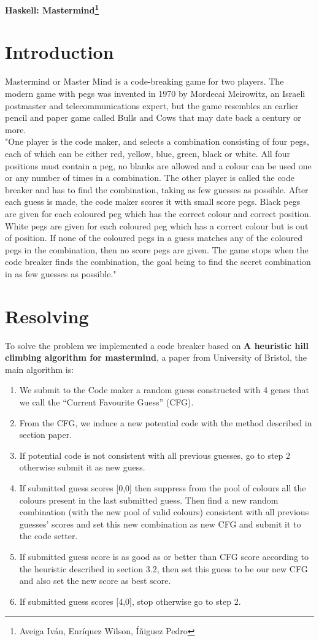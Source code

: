 \textbf{Haskell: Mastermind\footnote{Aveiga Iván, Enríquez Wilson, Íñiguez Pedro}}

\section{Introduction}
Mastermind or Master Mind is a code-breaking game for two players. The modern game with pegs was invented in 1970 by Mordecai Meirowitz, an Israeli postmaster and telecommunications expert, but the game resembles an earlier pencil and paper game called Bulls and Cows that may date back a century or more. \\

"One player is the code maker, and selects a combination consisting of four pegs, each of which can be either red, yellow, blue, green, black or white. All four positions must contain a peg, no blanks are allowed and a colour can be used one or any number of times in a combination. The other player is called the code breaker and has to find
the combination, taking as few guesses as possible. After each guess is made, the code maker scores it
with small score pegs. Black pegs are given for each coloured peg which has the correct colour and correct
position. White pegs are given for each coloured peg which has a correct colour but is out of position. If
none of the coloured pegs in a guess matches any of the coloured pegs in the combination, then no score
pegs are given. The game stops when the code breaker finds the combination, the goal being to find
the secret combination in as few guesses as possible."

\section{Resolving}
To solve the problem we implemented a code breaker based on \textbf{
A heuristic hill climbing algorithm for mastermind}, a paper from University of Bristol, the main algorithm is: 
 \begin{enumerate}
  \item We submit to the Code maker a random guess
 	constructed with 4 genes that we call the “Current
 	Favourite Guess” (CFG).
 	\item From the CFG, we induce a new potential code
 	with the method described in section paper.
 	\item If potential code is not consistent with all previous
 	guesses, go to step 2 otherwise submit it as new
 	guess.
 	\item If submitted guess scores [0,0] then suppress from
 	the pool of colours all the colours present in the last
 	submitted guess. Then find a new random
 	combination (with the new pool of valid colours)
 	consistent with all previous guesses’ scores and set
 	this new combination as new CFG and submit it to
 	the code setter.
 	\item If submitted guess score is as good as or better
 	than CFG score according to the heuristic described
 	in section 3.2, then set this guess to be our new CFG
 	and also set the new score as best score.
 	\item If submitted guess scores [4,0], stop otherwise go
 	to step 2.
 \end{enumerate}

